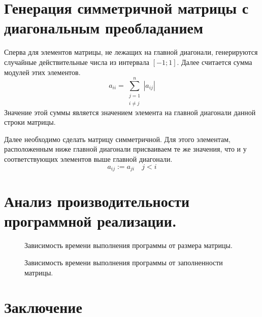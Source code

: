 \documentclass[a4paper, fontsize=14pt]{article}
\begin{document}
\section{Генерация симметричной матрицы с диагональным преобладанием}
Сперва для элементов матрицы, не лежащих на главной диагонали, генерируются случайные действительные
числа из интервала $[-1;1]$. Далее считается сумма модулей этих элементов. 
$$
    a_{ii} = \sum^{n}_{\substack{j=1\\ i \neq j}} |a_{ij}| 
$$
Значение этой суммы является значением элемента на главной диагонали данной строки матрицы. 

Далее необходимо сделать матрицу симметричной. Для этого элементам, расположенным ниже главной
диагонали присваиваем те же значения, что и у соответствующих элементов выше главной диагонали.
$$
    a_{ij} := a_{ji} \quad j<i
$$
\section{Анализ производительности программной реализации.}
\begin{figure}[H]
    \label{fig:comp}
    \scriptsize
    \centering
    
    \caption{Зависимость времени выполнения программы от размера матрицы.}
\end{figure}
\begin{figure}[H]
    \label{fig:fill}
    \scriptsize
    \centering
    
    \caption{Зависимость времени выполнения программы от заполненности матрицы.}
\end{figure}

\newpage

\section*{Заключение}

\newpage


\begin{thebibliography}{5}
\end{thebibliography}
\end{document}
